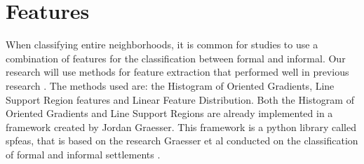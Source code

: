 \section{Features}

When classifying entire neighborhoods, it is common for studies to use
a combination of features for the classification between formal and informal.
Our research will use methods for feature extraction that performed well in
previous research \cite{graesser2012image}. The methods used are: the Histogram
of Oriented Gradients, Line Support Region features and Linear Feature
Distribution. Both the Histogram of Oriented Gradients and Line Support Regions
are already implemented in a framework created by Jordan Graesser. This
framework is a python library called spfeas, that is based on the
research Graesser et al conducted on the classification of formal and informal
settlements \cite{graesser2012image}. 









